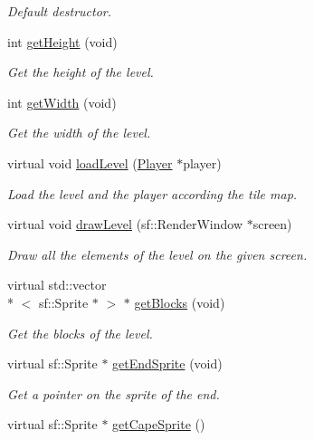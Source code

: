 \begin{DoxyCompactItemize}
\begin{DoxyCompactList}\small\item\em Default destructor. \end{DoxyCompactList}\item 
int \hyperlink{class_level_one_ad42ac4352d8559121504d6ff19a76cde}{get\-Height} (void)
\begin{DoxyCompactList}\small\item\em Get the height of the level. \end{DoxyCompactList}\item 
int \hyperlink{class_level_one_acc6a1535bc43ee0cd38e9ae688d71f41}{get\-Width} (void)
\begin{DoxyCompactList}\small\item\em Get the width of the level. \end{DoxyCompactList}\item 
virtual void \hyperlink{class_level_one_a072a98e693b35e9d8bafc7ae78966a86}{load\-Level} (\hyperlink{class_player}{Player} $\ast$player)
\begin{DoxyCompactList}\small\item\em Load the level and the player according the tile map. \end{DoxyCompactList}\item 
virtual void \hyperlink{class_level_one_ac0c5c722d11a026de024ab4a4cbd20ff}{draw\-Level} (sf\-::\-Render\-Window $\ast$screen)
\begin{DoxyCompactList}\small\item\em Draw all the elements of the level on the given screen. \end{DoxyCompactList}\item 
virtual std\-::vector\\*
$<$ sf\-::\-Sprite $\ast$ $>$ $\ast$ \hyperlink{class_level_one_a1037e8727782792343b7374eddd535af}{get\-Blocks} (void)
\begin{DoxyCompactList}\small\item\em Get the blocks of the level. \end{DoxyCompactList}\item 
virtual sf\-::\-Sprite $\ast$ \hyperlink{class_level_one_a2fb4139507f1b0168e8adc3e137d1e94}{get\-End\-Sprite} (void)
\begin{DoxyCompactList}\small\item\em Get a pointer on the sprite of the end. \end{DoxyCompactList}\item 
virtual sf\-::\-Sprite $\ast$ \hyperlink{class_level_one_aa2bb199782d979d50a7143ffb9c3a2a5}{get\-Cape\-Sprite} ()

\end{DoxyCompactItemize}

